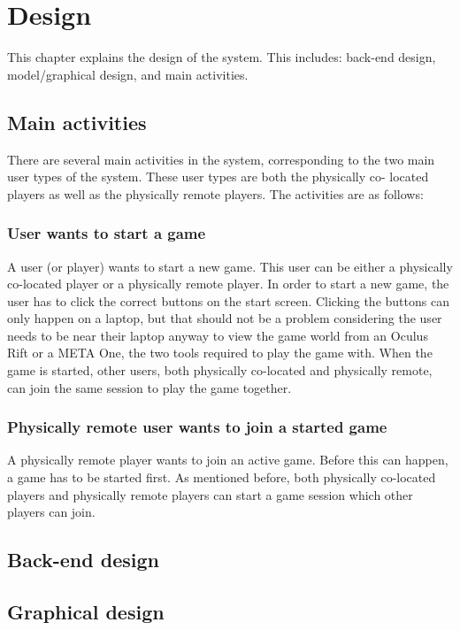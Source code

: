 \chapter{Design} \label{cha:design}
	This chapter explains the design of the system. This includes: back-end
	design, model/graphical design, and main activities.
	\section{Main activities} \label{sec:mainactivities}
	There are several main activities in the system, corresponding to the two
	main user types of the system. These user types are both the physically co-
	located	players as well as the physically remote players. The activities
	are as follows:
		\subsection{User wants to start a game} \label{ssec:userstartgame}
		A user (or player) wants to start a new game. This user can be either
		a physically co-located player or a physically remote player. In
		order to start a new game, the user has to click the correct buttons
		on the start screen. Clicking the buttons can only happen on a laptop,
		but that should not be a problem considering the user needs to be near
		their laptop anyway to view the game world from an Oculus Rift or a
		META One, the two tools required to play the game with. When the game
		is started, other users, both physically co-located and physically
		remote, can join the same session to play the game together.
		\subsection{Physically remote user wants to join a started game}
		A physically remote player wants to join an active game. Before
		this can happen, a game has to be started first. As mentioned
		before, both physically co-located players and physically remote
		players can start a game session which other players can join. 
	
	
	\section{Back-end design} \label{sec:backenddesign}
	
	
	\section{Graphical design} \label{sec:graphicaldesign}
